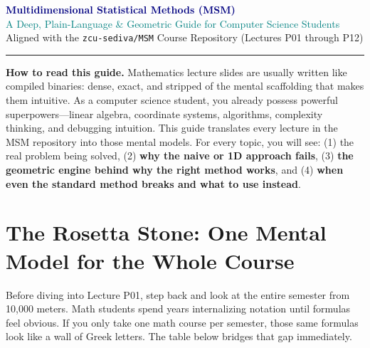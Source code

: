 \documentclass[11pt, a4paper]{article}
\begin{document}
\begin{center}
    {\LARGE\bfseries\textcolor{navy}{Multidimensional Statistical Methods (MSM)}}\\[0.4em]
    {\large\textcolor{teal}{A Deep, Plain-Language \& Geometric Guide for Computer Science Students}}\\[0.6em]
    {\small\textcolor{slate}{Aligned with the \texttt{zcu-sediva/MSM} Course Repository (Lectures P01 through P12)}}
\end{center}

\vspace{0.3em}
\noindent\textcolor{navy}{\rule{\textwidth}{1.2pt}}
\vspace{0.3em}

\textbf{How to read this guide.} Mathematics lecture slides are usually written like compiled binaries: dense, exact, and stripped of the mental scaffolding that makes them intuitive. As a computer science student, you already possess powerful superpowers---linear algebra, coordinate systems, algorithms, complexity thinking, and debugging intuition. This guide translates every lecture in the MSM repository into those mental models. For every topic, you will see: (1) the real problem being solved, (2) \textbf{why the naive or 1D approach fails}, (3) \textbf{the geometric engine behind why the right method works}, and (4) \textbf{when even the standard method breaks and what to use instead}.

\tableofcontents
\newpage

\section{The Rosetta Stone: One Mental Model for the Whole Course}

Before diving into Lecture P01, step back and look at the entire semester from 10,000 meters. Math students spend years internalizing notation until formulas feel obvious. If you only take one math course per semester, those same formulas look like a wall of Greek letters. The table below bridges that gap immediately.
\end{document}
